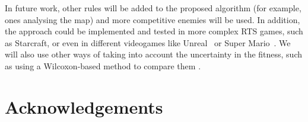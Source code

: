 \documentclass[preprint]{elsarticle}
\begin{document}



In future work, other rules will be added to the proposed algorithm
(for example, ones analysing the map) and more competitive enemies
will be used. In addition, the approach could be implemented and
tested in more complex RTS games, such as Starcraft, or even in
different videogames like Unreal\texttrademark~ or Super
Mario\texttrademark~. We will also use other ways of taking into
account the uncertainty in the fitness, such as using a Wilcoxon-based
method to compare them \cite{merelo2016statistical}. 

\section*{Acknowledgements}



\end{document}
